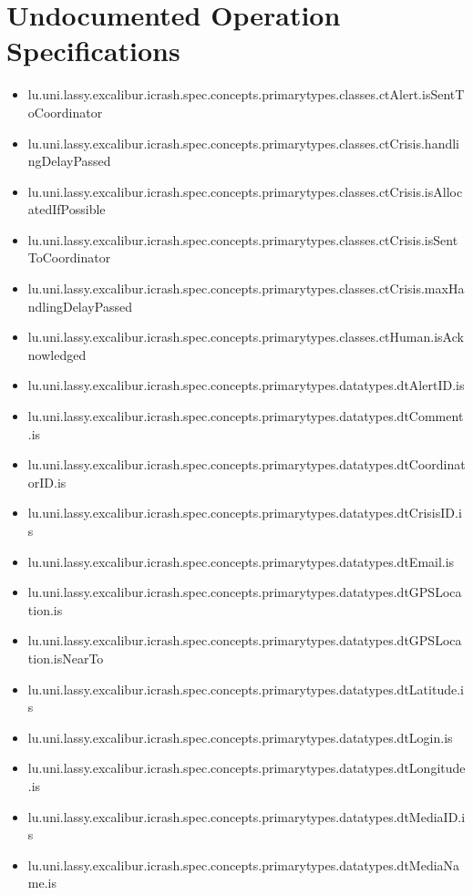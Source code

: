 \section[Undocumented Operation Specifications]{Undocumented Operation Specifications}
\begin{itemize}
\item lu.uni.lassy.excalibur.icrash.spec.concepts.primarytypes.classes.ctAlert.isSentToCoordinator 
\item lu.uni.lassy.excalibur.icrash.spec.concepts.primarytypes.classes.ctCrisis.handlingDelayPassed 
\item lu.uni.lassy.excalibur.icrash.spec.concepts.primarytypes.classes.ctCrisis.isAllocatedIfPossible 
\item lu.uni.lassy.excalibur.icrash.spec.concepts.primarytypes.classes.ctCrisis.isSentToCoordinator 
\item lu.uni.lassy.excalibur.icrash.spec.concepts.primarytypes.classes.ctCrisis.maxHandlingDelayPassed 
\item lu.uni.lassy.excalibur.icrash.spec.concepts.primarytypes.classes.ctHuman.isAcknowledged 
\item lu.uni.lassy.excalibur.icrash.spec.concepts.primarytypes.datatypes.dtAlertID.is 
\item lu.uni.lassy.excalibur.icrash.spec.concepts.primarytypes.datatypes.dtComment.is 
\item lu.uni.lassy.excalibur.icrash.spec.concepts.primarytypes.datatypes.dtCoordinatorID.is 
\item lu.uni.lassy.excalibur.icrash.spec.concepts.primarytypes.datatypes.dtCrisisID.is 
\item lu.uni.lassy.excalibur.icrash.spec.concepts.primarytypes.datatypes.dtEmail.is 
\item lu.uni.lassy.excalibur.icrash.spec.concepts.primarytypes.datatypes.dtGPSLocation.is 
\item lu.uni.lassy.excalibur.icrash.spec.concepts.primarytypes.datatypes.dtGPSLocation.isNearTo 
\item lu.uni.lassy.excalibur.icrash.spec.concepts.primarytypes.datatypes.dtLatitude.is 
\item lu.uni.lassy.excalibur.icrash.spec.concepts.primarytypes.datatypes.dtLogin.is 
\item lu.uni.lassy.excalibur.icrash.spec.concepts.primarytypes.datatypes.dtLongitude.is 
\item lu.uni.lassy.excalibur.icrash.spec.concepts.primarytypes.datatypes.dtMediaID.is 
\item lu.uni.lassy.excalibur.icrash.spec.concepts.primarytypes.datatypes.dtMediaName.is 

\end{itemize}
